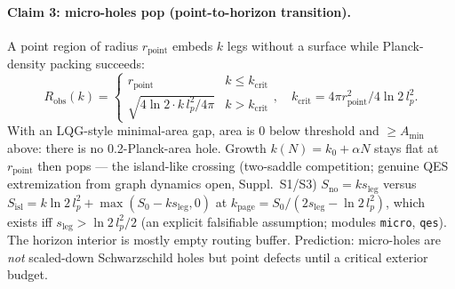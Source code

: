 \documentclass[11pt]{article}
\begin{document}
\paragraph{Claim 3: micro-holes pop (point-to-horizon transition).}
A point region of radius $r_{\mathrm{point}}$ embeds $k$ legs without a
surface while Planck-density packing succeeds:
\begin{equation}
R_{\mathrm{obs}}(k) =
\begin{cases} r_{\mathrm{point}} & k \le k_{\mathrm{crit}} \\
\sqrt{4\ln 2\cdot k\,l_p^2/4\pi} & k > k_{\mathrm{crit}} \end{cases},
\quad k_{\mathrm{crit}} = 4\pi r_{\mathrm{point}}^2 / 4\ln 2\,l_p^2.
\label{eq:pop}
\end{equation}
With an LQG-style minimal-area gap, area is $0$ below threshold and
$\ge A_{\min}$ above: there is no 0.2-Planck-area hole. Growth
$k(N) = k_0 + \alpha N$ stays flat at $r_{\mathrm{point}}$ then pops --- the
island-like crossing (two-saddle competition; genuine QES extremization from graph dynamics open, Suppl.~S1/S3)
$S_{\mathrm{no}} = k s_{\mathrm{leg}}$ versus
$S_{\mathrm{isl}} = k\ln 2\,l_p^2 + \max(S_0 - k s_{\mathrm{leg}},0)$ at
$k_{\mathrm{page}} = S_0/(2s_{\mathrm{leg}} - \ln 2\,l_p^2)$, which exists iff
$s_{\mathrm{leg}} > \ln 2\,l_p^2/2$ (an explicit falsifiable assumption;
modules \texttt{micro}, \texttt{qes}). The horizon interior is mostly empty
routing buffer. Prediction: micro-holes are \emph{not} scaled-down
Schwarzschild holes but point defects until a critical exterior budget.
\end{document}
